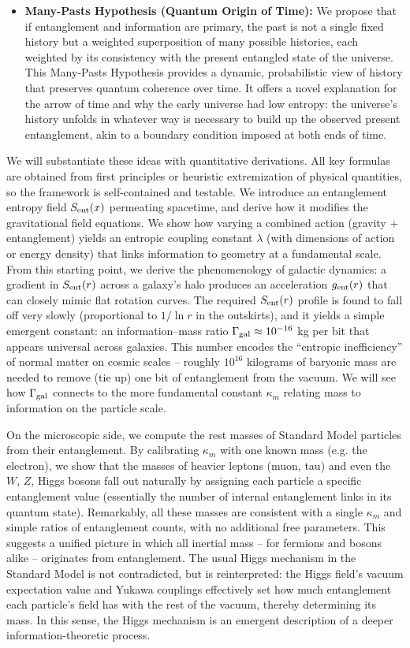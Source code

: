 \documentclass[11pt]{article}
\begin{document}
\begin{itemize}
    \item \textbf{Many-Pasts Hypothesis (Quantum Origin of Time):} We propose that if entanglement and information are primary, the past is not a single fixed history but a weighted superposition of many possible histories, each weighted by its consistency with the present entangled state of the universe. This Many-Pasts Hypothesis provides a dynamic, probabilistic view of history that preserves quantum coherence over time. It offers a novel explanation for the arrow of time and why the early universe had low entropy: the universe’s history unfolds in whatever way is necessary to build up the observed present entanglement, akin to a boundary condition imposed at both ends of time.
\end{itemize}

We will substantiate these ideas with quantitative derivations. All key formulas are obtained from first principles or heuristic extremization of physical quantities, so the framework is self-contained and testable. We introduce an entanglement entropy field $S_{\rm ent}(x)$ permeating spacetime, and derive how it modifies the gravitational field equations. We show how varying a combined action (gravity + entanglement) yields an entropic coupling constant $\lambda$ (with dimensions of action or energy density) that links information to geometry at a fundamental scale. From this starting point, we derive the phenomenology of galactic dynamics: a gradient in $S_{\rm ent}(r)$ across a galaxy’s halo produces an acceleration $g_{\rm ent}(r)$ that can closely mimic flat rotation curves. The required $S_{\rm ent}(r)$ profile is found to fall off very slowly (proportional to $1/\ln r$ in the outskirts), and it yields a simple emergent constant: an information–mass ratio $\Gamma_{\rm gal} \approx 10^{-16}$ kg per bit that appears universal across galaxies. This number encodes the “entropic inefficiency” of normal matter on cosmic scales – roughly $10^{16}$ kilograms of baryonic mass are needed to remove (tie up) one bit of entanglement from the vacuum. We will see how $\Gamma_{\rm gal}$ connects to the more fundamental constant $\kappa_m$ relating mass to information on the particle scale.

On the microscopic side, we compute the rest masses of Standard Model particles from their entanglement. By calibrating $\kappa_m$ with one known mass (e.g. the electron), we show that the masses of heavier leptons (muon, tau) and even the $W$, $Z$, Higgs bosons fall out naturally by assigning each particle a specific entanglement value (essentially the number of internal entanglement links in its quantum state). Remarkably, all these masses are consistent with a single $\kappa_m$ and simple ratios of entanglement counts, with no additional free parameters. This suggests a unified picture in which all inertial mass – for fermions and bosons alike – originates from entanglement. The usual Higgs mechanism in the Standard Model is not contradicted, but is reinterpreted: the Higgs field’s vacuum expectation value and Yukawa couplings effectively set how much entanglement each particle’s field has with the rest of the vacuum, thereby determining its mass. In this sense, the Higgs mechanism is an emergent description of a deeper information-theoretic process.
\end{document}

